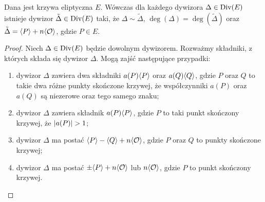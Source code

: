 \begin{theorem}\label{divisor_linear_reduction_theorem}
Dana jest krzywa eliptyczna $E$.
Wówczas dla każdego dywizora $\Delta \in \operatorname{Div}(E)$
istnieje dywizor $\tilde{\Delta} \in \operatorname{Div}(E)$ taki,
że $\Delta \sim \tilde{\Delta}$, $\deg(\Delta) = \deg(\tilde{\Delta})$
oraz $\tilde{\Delta} = \langle P\rangle + n\langle\mathcal{O}\rangle$,
gdzie $P \in E$.
\end{theorem}

\begin{proof}
Niech $\Delta \in \operatorname{Div}(E)$ będzie dowolnym dywizorem.
Rozważmy składniki, z których składa się dywizor $\Delta$.
Mogą zajść następujące przypadki:
\begin{enumerate}
\item dywizor $\Delta$ zawiera dwa składniki
$a(P)\langle P\rangle$ oraz $a(Q)\langle Q\rangle$,
gdzie $P$ oraz $Q$ to takie dwa różne punkty skończone krzywej,
że współczynniki $a(P)$ oraz $a(Q)$ są niezerowe oraz tego samego znaku;
\item dywizor $\Delta$ zawiera składnik $a(P)\langle P\rangle$,
gdzie $P$ to taki punkt skończony krzywej, że $\lvert a(P)\rvert > 1$;
\item dywizor $\Delta$ ma postać $\langle P\rangle - \langle Q\rangle + n\langle\mathcal{O}\rangle$,
gdzie $P$ oraz $Q$ to punkty skończone krzywej;
\item dywizor $\Delta$ ma postać $\pm\langle P\rangle + n\langle\mathcal{O}\rangle$
lub $n\langle\mathcal{O}\rangle$,
gdzie $P$ to punkt skończony krzywej.
\end{enumerate}


\end{proof}
